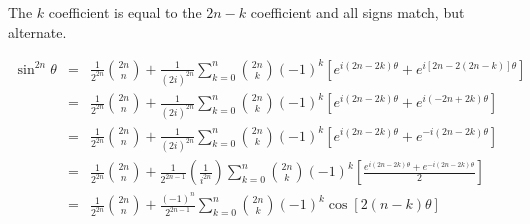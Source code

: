 \documentclass[letterpaper,12pt,fleqn]{article}
\renewcommand{\o}{\theta}
\begin{document}
\begin{theproof}
\begin{description}
The $k$ coefficient is equal to the $2n-k$ coefficient and all signs match, but
alternate.

\begin{eqnarray*}
\sin^{2n}\o &=& \frac{1}{2^{2n}}\binom{2n}{n}+
        \frac{1}{(2i)^{2n}}\sum_{k=0}^n\binom{2n}{k}(-1)^k
        \left[e^{i(2n-2k)\o}+e^{i[2n-2(2n-k)]\o}\right] \\
    &=& \frac{1}{2^{2n}}\binom{2n}{n}+
        \frac{1}{(2i)^{2n}}\sum_{k=0}^n\binom{2n}{k}(-1)^k
        \left[e^{i(2n-2k)\o}+e^{i(-2n+2k)\o}\right] \\
    &=& \frac{1}{2^{2n}}\binom{2n}{n}+
        \frac{1}{(2i)^{2n}}\sum_{k=0}^n\binom{2n}{k}(-1)^k
        \left[e^{i(2n-2k)\o}+e^{-i(2n-2k)\o}\right] \\
    &=& \frac{1}{2^{2n}}\binom{2n}{n}+
        \frac{1}{2^{2n-1}}\left(\frac{1}{i^{2n}}\right)\sum_{k=0}^n\binom{2n}{k}
        (-1)^k\left[\frac{e^{i(2n-2k)\o}+e^{-i(2n-2k)\o}}{2}\right] \\
    &=& \frac{1}{2^{2n}}\binom{2n}{n}+
        \frac{(-1)^n}{2^{2n-1}}\sum_{k=0}^n\binom{2n}{k}(-1)^k\cos[2(n-k)\o] \\
\end{eqnarray*}
\end{description}
\end{theproof}
\end{document}
